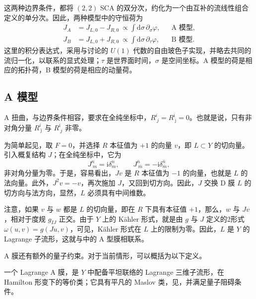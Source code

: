 这两种边界条件，都将 $(2,2)$ SCA 的双分次，约化为一个由互补的流线性组合定义的单分次。因此，两种模型中的守恒荷为
\begin{equation}\label{eq:3.167}
\begin{aligned}
J_A&=J_{L,0}-J_{R,0}
\ \propto\int\mathrm{d}\sigma\,\partial_\sigma\varphi,
&&\text{A 模型},\\
J_B&=J_{L,0}+J_{R,0}
\ \propto\int\mathrm{d}\sigma\,\partial_\tau\varphi,
&&\text{B 模型}.
\end{aligned}
\end{equation}
这里的积分表达式，采用与讨论的 $U(1)$ 代数的自由玻色子实现，并略去共同的流归一化，以联系的显式处理；$\tau$ 是世界面时间，$\sigma$ 是空间坐标。A 模型的荷是相应的拓扑荷，B 模型的荷是相应的动量荷。

\subsection{A 模型}\label{sec:3.6.1}

A 扭曲，与边界条件相容，要求在全纯坐标中，$R^i_{\ j}=R^{\bar\imath}_{\ \bar\jmath}=0$。也就是说，只有非对角分量 $R^i_{\ \bar\jmath}$ 与 $R^{\bar\imath}_{\ j}$ 非零。

为简单起见，取 $F=0$，并选择 $R$ 本征值为 $+1$ 的向量 $v$，即 $L\subset Y$ 的切向量。引入概复结构 $J$；在全纯坐标中，它为
\begin{equation}\label{eq:3.168}
J^n_{\ m}=\mathrm{i}\delta^n_m,\qquad
J^{\bar n}_{\ \bar m}=-\mathrm{i}\delta^{\bar n}_{\bar m},
\end{equation}
非对角分量为零。于是，容易看出，$Jv$ 是 $R$ 本征值为 $-1$ 的向量，也就是 $L$ 的法向量。此外，$J^2v=-v$，再次施加 $J$，又回到切方向。因此，$J$ 交换 D 膜 $L$ 的切方向与法方向，显然，$L$ 必须具有中间维数。

注意，如果 $v$ 与 $w$ 都是 $L$ 的切向量，即在 $R$ 下具有本征值 $+1$，那么，$w$ 与 $Jv$，相对于度规 $g_{IJ}$ 正交。由于 $Y$ 上的 K\"ahler 形式，就是由 $g$ 与 $J$ 定义的2形式 $\omega(u,v)=g(Ju,v)$，可见，K\"ahler 形式在 $L$ 上的限制为零。因此，$L$ 是 $Y$ 的 Lagrange 子流形，这就与中的 A 型膜相联系。

A 膜还有额外的量子约束。对于当前情形，可以概括为以下定义。
\begin{definition}\label{def:3.3}
一个 Lagrange A 膜，是 $Y$ 中配备平坦联络的 Lagrange 三维子流形，在 Hamilton 形变下的等价类；它具有平凡的 Maslov 类，见，并满足量子阻碍条件。
\end{definition}

